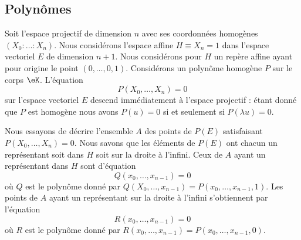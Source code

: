 \subsection{Polynômes}

Soit l'espace projectif de dimension \( n\) avec ses coordonnées homogènes \( (X_0:\ldots :X_n)\). Nous considérons l'espace affine \( H\equiv X_n=1\) dans l'espace vectoriel \( E\) de dimension \( n+1\). Nous considérons pour \( H\) un repère affine ayant pour origine le point \( (0,\ldots, 0,1)\). Considérons un polynôme homogène \( P\) sur le corps \( \eK\). L'équation 
\begin{equation}
    P(X_0,\ldots, X_n)=0
\end{equation}
sur l'espace vectoriel \( E\) descend immédiatement à l'espace projectif : étant donné que \( P\) est homogène nous avons \( P(u)=0\) si et seulement si \( P(\lambda u)=0\).

Nous essayons de décrire l'ensemble \( A\) des points de \( P(E)\) satisfaisant \( P(X_0,\ldots, X_n)=0\). Nous savons que les éléments de \( P(E)\) ont chacun un représentant soit dans \( H\) soit sur la droite à l'infini. Ceux de \( A\) ayant un représentant dans \( H\) sont d'équation
\begin{equation}
    Q(x_0,\ldots, x_{n-1})=0
\end{equation}
où \( Q\) est le polynôme donné par \( Q(X_0,\ldots, x_{n-1})=P(x_0,\ldots, x_{n-1},1)\). Les points de \( A\) ayant un représentant sur la droite à l'infini s'obtiennent par l'équation
\begin{equation}
    R(x_0,\ldots, x_{n-1})=0
\end{equation}
où \( R\) est le polynôme donné par \( R(x_0,\ldots, x_{n-1})=P(x_0,\ldots, x_{n-1},0)\).

